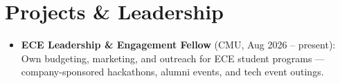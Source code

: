 \documentclass[11pt, letterpaper]{article}
\begin{document}
\section{Projects \& Leadership}
\begin{itemize}
  \item \textbf{ECE Leadership \& Engagement Fellow} (CMU, Aug 2026 -- present): Own budgeting, marketing, and outreach for ECE student programs --- company-sponsored hackathons, alumni events, and tech event outings.
\end{itemize}
\end{document}
